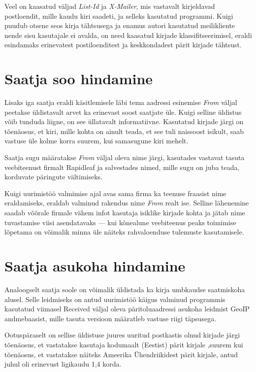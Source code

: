 \documentclass[]{trkuur}
\let\eng\emph
\begin{document}
Veel on kaasatud väljad \eng{List-Id} ja \eng{X-Mailer}, mis vastavalt kirjeldavad
postloendit, mille kaudu kiri saadeti, ja selleks kasutatud programmi. Kuigi
puudub otsene seos kirja tähtsusega ja enamus autori kasutatud meilikliente
nende sisu kasutajale ei avalda, on need kaasatud kirjade klassifitseerimisel,
eraldi esindamaks erinevatest postiloenditest ja keskkondadest pärit kirjade
tähtsust.

\section{Saatja soo hindamine}
Lisaks iga saatja eraldi käsitlemisele läbi tema aadressi esinemise \eng{From} väljal
peetakse üldistavalt arvet ka erinevast soost saatjate üle. Kuigi selline
üldistus võib tunduda liigne, on see üllatavalt informatiivne. Kasutatud kirjade
järgi on tõenäosus, et kiri, mille kohta on ainult teada, et see tuli naissoost
isikult, saab vastuse üle kolme korra suurem, kui samasugune kiri mehelt.

Saatja sugu määratakse \eng{From} väljal oleva nime järgi, kasutades vastavat tasuta
veebiteenust firmalt Rapidleaf \autocite{RapidLeafGender}
 ja salvestades nimed, mille sugu on juba teada, korduvate päringute vältimiseks.

Kuigi uurimistöö valmimise ajal avas sama firma ka teenuse fraasist
nime eraldamiseks, eraldab valminud rakendus nime \eng{From} realt ise. Selline
lähenemine saadab võõrale firmale vähem infot kasutaja isiklike kirjade kohta
ja jätab nime tuvastamise viisi asendatavaks --- kui kõnealune veebiteenus
peaks toimimise lõpetama on võimalik minna üle näiteks rahvaloenduse tulemuste
kasutamisele.

\section{Saatja asukoha hindamine}
Analoogselt saatja soole on võimalik üldistada ka kirja umbkaudse
saatmiskoha alusel. Selle leidmiseks on antud uurimistöö käigus valminud
programmis kasutatud viimasel Received väljal oleva päritoluaadressi asukoha
leidmist GeoIP andmebaasist, mille tasuta versioon määratleb vastuse riigi
täpsusega. \autocite{MaxmindGeoIP}

Ootuspäraselt on sellise üldistuse juures uuritud postkastis olnud kirjade järgi
tõenäosus, et vastatakse kasutaja kodumaalt (Eestist) pärit kirjale ,suurem kui
tõenäosus, et vastatakse näiteks Ameerika Ühendriikidest pärit kirjale, antud
juhul oli erinevust ligikaudu 1,4 korda.
\end{document}
